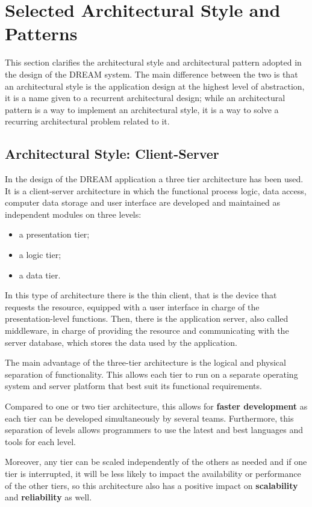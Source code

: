\section{Selected Architectural Style and Patterns}
This section clarifies the architectural style and architectural pattern adopted in the design of the DREAM system.
The main difference between the two is that an architectural style is the application design at the highest level of abstraction, it is a name given to a recurrent architectural design; while an architectural pattern is a way to implement an architectural style, it is a way to solve a recurring architectural problem related to it.

\subsection{Architectural Style: Client-Server}
In the design of the DREAM application a three tier architecture has been used. It is a client-server architecture in which the functional process logic, data access, computer data storage and user interface are developed and maintained as independent modules on three levels:
\begin{itemize}
    \item a presentation tier;
    \item a logic tier;
    \item a data tier. 
\end{itemize}

In this type of architecture there is the thin client, that is the device that requests the resource, equipped with a user interface in charge of the presentation-level functions. Then, there is the application server, also called middleware, in charge of providing the resource and communicating with the server database, which stores the data used by the application.

The main advantage of the three-tier architecture is the logical and physical separation of functionality. This allows each tier to run on a separate operating system and server platform that best suit its functional requirements.

Compared to one or two tier architecture, this allows for \textbf{faster development} as each tier can be developed simultaneously by several teams. Furthermore, this separation of levels allows programmers to use the latest and best languages and tools for each level.

Moreover, any tier can be scaled independently of the others as needed and if one tier is interrupted, it will be less likely to impact the availability or performance of the other tiers, so this architecture also has a positive impact on \textbf{scalability} and \textbf{reliability} as well.

